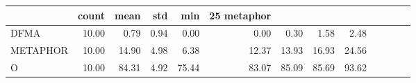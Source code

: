 \begin{tabular}{lrrrrrrrr}
\toprule
 & count & mean & std & min & 25%
metaphor &  &  &  &  &  &  &  &  \\
\midrule
DFMA & 10.00 & 0.79 & 0.94 & 0.00 & 0.00 & 0.30 & 1.58 & 2.48 \\
METAPHOR & 10.00 & 14.90 & 4.98 & 6.38 & 12.37 & 13.93 & 16.93 & 24.56 \\
O & 10.00 & 84.31 & 4.92 & 75.44 & 83.07 & 85.09 & 85.69 & 93.62 \\
\bottomrule
\end{tabular}
